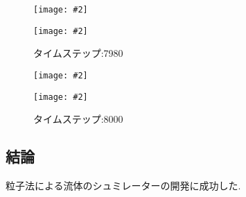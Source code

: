 \documentclass[uplatex,a4j,11pt]{jsarticle}
\makeatletter
\def\fgcaption{\def\@captype{figure}\caption}
\newcommand{\mfig}[3][width=15cm]{
\begin{center}
    \texttt{[image: \#2]}
\fgcaption{#3 \label{fig:#2}}
\end{center}
}
\makeatother
\begin{document}
\begin{figure}[htbp]
    \begin{minipage}{0.5\hsize}
        \mfig[width=7cm]{sim2/out0797.eps}{タイムステップ:7970}
    \end{minipage}
    \begin{minipage}{0.5\hsize}
        \mfig[width=7cm]{sim2/out0798.eps}{タイムステップ:7980}
    \end{minipage} 
\end{figure}
\begin{figure}[htbp]
    \begin{minipage}{0.5\hsize}
        \mfig[width=7cm]{sim2/out0799.eps}{タイムステップ:7990}
    \end{minipage}
    \begin{minipage}{0.5\hsize}
        \mfig[width=7cm]{sim2/out0800.eps}{タイムステップ:8000}
    \end{minipage} 
\end{figure}
\subsection{結論}
粒子法による流体のシュミレーターの開発に成功した.
\newpage

\newpage

\end{document}
